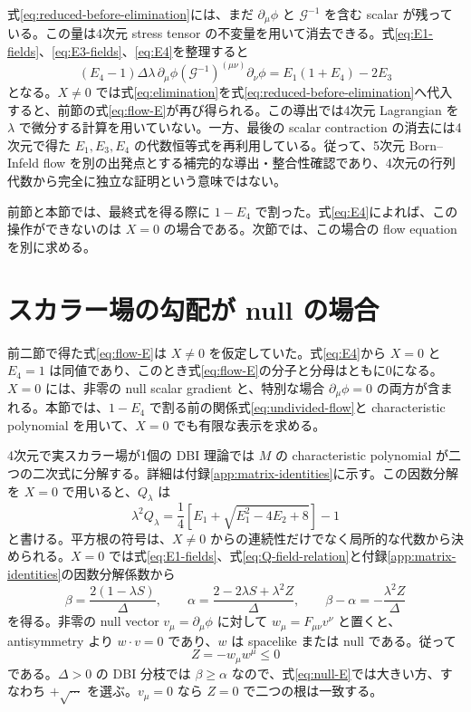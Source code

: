 \documentclass[a4paper,11pt]{ltjsarticle}
\numberwithin{equation}{section}
\newcommand{\G}{\mathcal G}
\begin{document}
式\eqref{eq:reduced-before-elimination}には、まだ $\partial_\mu\phi$ と $\G^{-1}$ を含む scalar が残っている。この量は4次元 stress tensor の不変量を用いて消去できる。式\eqref{eq:E1-fields}、\eqref{eq:E3-fields}、\eqref{eq:E4}を整理すると
\begin{equation}
 (E_4-1)\Delta\lambda\,
 \partial_\mu\phi(\G^{-1})^{(\mu\nu)}\partial_\nu\phi
 =E_1(1+E_4)-2E_3
 \label{eq:elimination}
\end{equation}
となる。$X\neq0$ では式\eqref{eq:elimination}を式\eqref{eq:reduced-before-elimination}へ代入すると、前節の式\eqref{eq:flow-E}が再び得られる。この導出では4次元 Lagrangian を $\lambda$ で微分する計算を用いていない。一方、最後の scalar contraction の消去には4次元で得た $E_1,E_3,E_4$ の代数恒等式を再利用している。従って、5次元 Born--Infeld flow を別の出発点とする補完的な導出・整合性確認であり、4次元の行列代数から完全に独立な証明という意味ではない。

前節と本節では、最終式を得る際に $1-E_4$ で割った。式\eqref{eq:E4}によれば、この操作ができないのは $X=0$ の場合である。次節では、この場合の flow equation を別に求める。

\section{スカラー場の勾配が null の場合}
\label{sec:null}

前二節で得た式\eqref{eq:flow-E}は $X\neq0$ を仮定していた。式\eqref{eq:E4}から $X=0$ と $E_4=1$ は同値であり、このとき式\eqref{eq:flow-E}の分子と分母はともに0になる。$X=0$ には、非零の null scalar gradient と、特別な場合 $\partial_\mu\phi=0$ の両方が含まれる。本節では、$1-E_4$ で割る前の関係式\eqref{eq:undivided-flow}と characteristic polynomial を用いて、$X=0$ でも有限な表示を求める。

4次元で実スカラー場が1個の DBI 理論では $M$ の characteristic polynomial が二つの二次式に分解する。詳細は付録\ref{app:matrix-identities}に示す。この因数分解を $X=0$ で用いると、$Q_\lambda$ は
\begin{equation}
 \lambda^2Q_\lambda
 =\frac14\left[E_1+\sqrt{E_1^2-4E_2+8}\right]-1
 \label{eq:null-E}
\end{equation}
と書ける。平方根の符号は、$X\neq0$ からの連続性だけでなく局所的な代数から決められる。$X=0$ では式\eqref{eq:E1-fields}、式\eqref{eq:Q-field-relation}と付録\ref{app:matrix-identities}の因数分解係数から
\begin{equation}
 \beta=\frac{2(1-\lambda S)}{\Delta},
 \qquad
 \alpha=\frac{2-2\lambda S+\lambda^2Z}{\Delta},
 \qquad
 \beta-\alpha=-\frac{\lambda^2Z}{\Delta}
 \label{eq:null-alpha-beta-fields}
\end{equation}
を得る。非零の null vector $v_\mu=\partial_\mu\phi$ に対して $w_\mu=F_{\mu\nu}v^\nu$ と置くと、antisymmetry より $w\cdot v=0$ であり、$w$ は spacelike または null である。従って
\begin{equation}
 Z=-w_\mu w^\mu\le0
 \label{eq:null-Z-sign}
\end{equation}
である。$\Delta>0$ の DBI 分枝では $\beta\ge\alpha$ なので、式\eqref{eq:null-E}では大きい方、すなわち $+\sqrt{\cdots}$ を選ぶ。$v_\mu=0$ なら $Z=0$ で二つの根は一致する。
\end{document}
